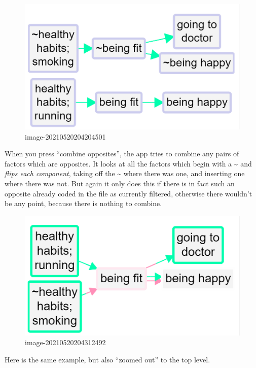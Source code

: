 \documentclass[
]{book}
\begin{document}
\begin{figure}
\centering
\includegraphics[width=6.77083in,height=\textheight]{_assets/image-20210520204204501.png}
\caption{image-20210520204204501}
\end{figure}

When you press ``combine opposites'', the app tries to combine any pairs of factors which are opposites. It looks at all the factors which begin with a \textasciitilde{} and \emph{flips each component}, taking off the \textasciitilde{} where there was one, and inserting one where there was not. But again it only does this if there is in fact such an opposite already coded in the file as currently filtered, otherwise there wouldn't be any point, because there is nothing to combine.

\begin{figure}
\centering
\includegraphics[width=6.77083in,height=\textheight]{_assets/image-20210520204312492.png}
\caption{image-20210520204312492}
\end{figure}

Here is the same example, but also ``zoomed out'' to the top level.
\end{document}
